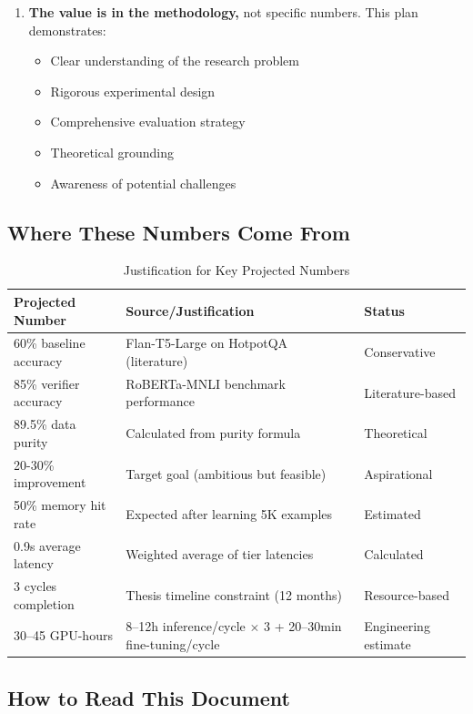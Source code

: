 \documentclass[12pt,a4paper]{article}
\theoremstyle{definition}
\begin{document}
\begin{tcolorbox}[
    colback=yellow!10!white,
    colframe=orange!75!black,
    title={\Large\textbf{IMPORTANT: About the Numbers in This Document}},
    breakable,
    enhanced,
    fontupper=\normalsize
]
\begin{enumerate}
    \item \textbf{The value is in the methodology,} not specific numbers. This plan demonstrates:
    \begin{itemize}
        \item Clear understanding of the research problem
        \item Rigorous experimental design
        \item Comprehensive evaluation strategy
        \item Theoretical grounding
        \item Awareness of potential challenges
    \end{itemize}
\end{enumerate}

\subsection*{Where These Numbers Come From}

\begin{table}[h]
\centering
\caption{Justification for Key Projected Numbers}
\small
\begin{tabular}{lll}
\toprule
\textbf{Projected Number} & \textbf{Source/Justification} & \textbf{Status} \\
\midrule
60\% baseline accuracy & Flan-T5-Large on HotpotQA (literature) & Conservative \\
85\% verifier accuracy & RoBERTa-MNLI benchmark performance & Literature-based \\
89.5\% data purity & Calculated from purity formula & Theoretical \\
20-30\% improvement & Target goal (ambitious but feasible) & Aspirational \\
50\% memory hit rate & Expected after learning 5K examples & Estimated \\
0.9s average latency & Weighted average of tier latencies & Calculated \\
3 cycles completion & Thesis timeline constraint (12 months) & Resource-based \\
30--45 GPU-hours & 8--12h inference/cycle $\times$ 3 + 20--30min fine-tuning/cycle & Engineering estimate \\
\bottomrule
\end{tabular}
\end{table}

\subsection*{How to Read This Document}


\end{tcolorbox}
\end{document}
